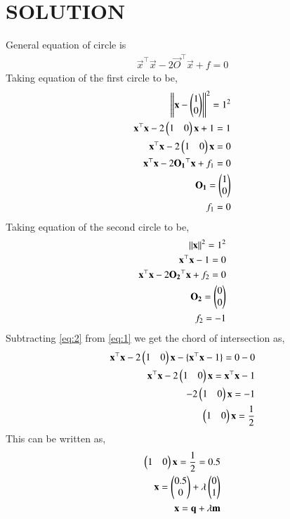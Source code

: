\documentclass[journal,12pt,twocolumn]{IEEEtran}
\begin{document}
\section*{SOLUTION}
\begin{enumerate}
General equation of circle is
\begin{align}
  \Vec{x}^\top\Vec{x} - 2 \Vec{O}^\top \Vec{x} + f=0
\end{align}
Taking equation of the first circle to be,
\begin{align}
 \norm{\vec{x}-\myvec{1 \\0}} ^2 =1 ^2   \\ 
 \Vec{x}^\top\Vec{x} - 2 \myvec{1&0} \Vec{x} + 1 =1\\
  \Vec{x}^\top\Vec{x} - 2 \myvec{1&0} \Vec{x}  =0 \label{eq:1}\\
\Vec{x}^\top\Vec{x} - 2 \Vec{O_1}^\top \Vec{x} + f_1=0\\
\Vec{O_1}=\myvec{1\\0}\\
f_1=0
\end{align}
Taking equation of the second circle to be,
\begin{align}
 \norm{\vec{x}} ^2 =1 ^2   \\ 
 \Vec{x}^\top\Vec{x} -1=0 \label{eq:2} \\
\Vec{x}^\top\Vec{x} - 2 \Vec{O_2}^\top \Vec{x} + f_2=0\\
\Vec{O_2}=\myvec{0\\0}\\
f_2=-1
\end{align}
Subtracting \eqref{eq:2} from \eqref{eq:1} we get the chord of intersection as,
\begin{align}
     \Vec{x}^\top\Vec{x} - 2 \myvec{1&0} \Vec{x} -\{\Vec{x}^\top\Vec{x} -1\} =0 -0\\
 \Vec{x}^\top\Vec{x} - 2 \myvec{1&0}\Vec{x} = \Vec{x}^\top\Vec{x} -1\\
- 2 \myvec{1&0}\Vec{x} = -1\\
\myvec{1&0}\Vec{x} = \frac{1}{2}\\
\end{align}
This can be written as,
\begin{align}
    \myvec{1&0}\Vec{x} = \frac{1}{2}=0.5\\
   \vec{x}=\myvec{0.5\\0}+\lambda\myvec{0\\1} \\
    \vec{x}=\vec{q}+\lambda\vec{m} \label{eq:3}\\

\end{align}
\end{enumerate}
\end{document}
